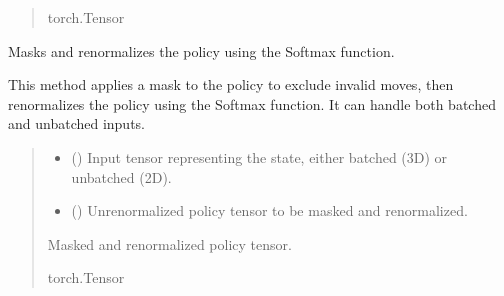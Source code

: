 \documentclass[letterpaper,10pt,english]{sphinxmanual}
\begin{document}
\begin{fulllineitems}
\begin{fulllineitems}
\begin{quote}
\begin{description}
\sphinxAtStartPar
torch.Tensor

\end{description}\end{quote}

\end{fulllineitems}


\begin{fulllineitems}
\label{\detokenize{modules:Resnet.ResNet.mask_and_renormalize}}
\pysigstartsignatures
{}
\pysigstopsignatures
\sphinxAtStartPar
Masks and renormalizes the policy using the Softmax function.

\sphinxAtStartPar
This method applies a mask to the policy to exclude invalid moves, then renormalizes
the policy using the Softmax function. It can handle both batched and unbatched inputs.
\begin{quote}\begin{description}
\begin{itemize}
\item {} 
\sphinxAtStartPar
{} () \textendash{} Input tensor representing the state, either batched (3D) or unbatched (2D).

\item {} 
\sphinxAtStartPar
{} () \textendash{} Unrenormalized policy tensor to be masked and renormalized.

\end{itemize}

\sphinxAtStartPar
Masked and renormalized policy tensor.

\sphinxAtStartPar
torch.Tensor

\end{description}\end{quote}

\end{fulllineitems}



\end{fulllineitems}
\end{document}
